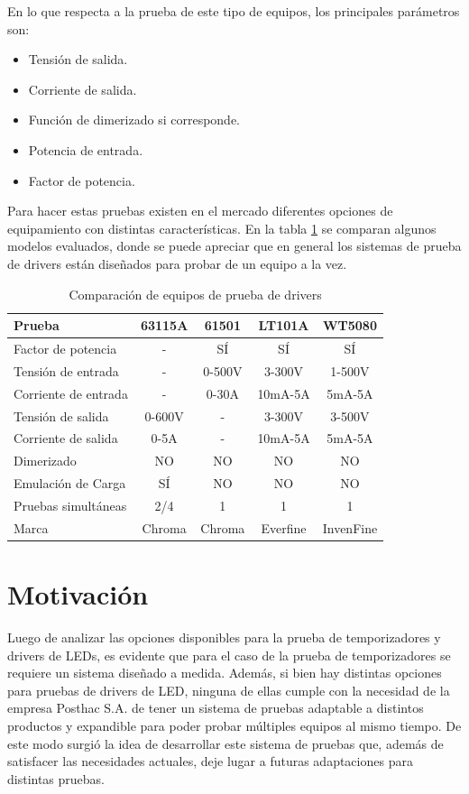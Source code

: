 En lo que respecta a la prueba de este tipo de equipos, los principales parámetros son:
\begin{itemize}
	\item Tensión de salida.
	\item Corriente de salida.
	\item Función de dimerizado si corresponde.
	\item Potencia de entrada.
	\item Factor de potencia.
\end{itemize}

	Para hacer estas pruebas existen en el mercado diferentes opciones  de equipamiento con distintas características. En la tabla \ref{tab:ProbadoresDrivers} se comparan algunos modelos evaluados, donde se puede apreciar que en general los sistemas de prueba de drivers están diseñados para probar de un equipo a la vez.
	
	\begin{table}[h]
	\centering
	\caption[Tabla de comparación de equipos de prueba de drivers]{Comparación de equipos de prueba de drivers}
	\begin{tabular}{l c c c c}    
		\toprule
		\textbf{Prueba} 	 & \textbf{63115A} & \textbf{61501}& \textbf{LT101A}		& \textbf{WT5080}  \\
		\midrule
		Factor de potencia & - & SÍ & SÍ & SÍ \\		
		Tensión de entrada	 & - & 0-500V & 3-300V & 1-500V \\
		Corriente de entrada& - & 0-30A & 10mA-5A & 5mA-5A \\
		Tensión de salida & 0-600V & - & 3-300V & 3-500V \\		
		Corriente de salida & 0-5A & - & 10mA-5A & 5mA-5A \\		
		Dimerizado & NO & NO & NO & NO \\		
		Emulación de Carga & SÍ & NO & NO & NO \\
		Pruebas simultáneas &2/4 & 1 & 1 & 1 \\
		Marca & Chroma & Chroma & Everfine & InvenFine \\
		\bottomrule
		\hline
	\end{tabular}
	\label{tab:ProbadoresDrivers}
\end{table}

\section{Motivación}

Luego de analizar las opciones disponibles para la prueba de temporizadores y drivers de LEDs, es evidente que para el caso de la prueba de temporizadores se requiere un sistema diseñado a medida. Además, si bien hay distintas opciones para pruebas de drivers de LED, ninguna de ellas cumple con la necesidad de la empresa Posthac S.A. de tener un sistema de pruebas adaptable a distintos productos y expandible para poder probar múltiples equipos al mismo tiempo. De este modo surgió la idea de desarrollar este sistema de pruebas que, además de satisfacer las necesidades actuales, deje lugar a futuras adaptaciones para distintas pruebas.

